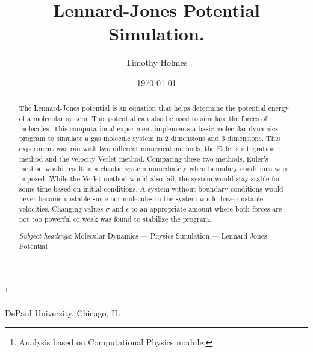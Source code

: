 \documentclass[reprint,amsmath,amssymb, aps, 10pt, a4paper, english, reqno]{revtex4-1}
\begin{document}

\title{Lennard-Jones Potential Simulation.}%
\thanks{Analysis based on Computational Physics module.}%

\author{Timothy Holmes}

DePaul University, Chicago, IL\\

\date{\today}%
\setlength\parindent{0pt}
\begin{abstract}

\setlength\parindent{0pt}
The Lennard-Jones potential is an equation that helps determine the potential energy of a molecular system. This potential can also be used to simulate the forces of molecules. This computational experiment implements a basic molecular dynamics program to simulate a gas molecule system in 2 dimensions and 3 dimensions. This experiment was ran with two different numerical methods, the Euler's integration method and  the velocity Verlet method. Comparing these two methods, Euler's method would result in a chaotic system immediately when boundary conditions were imposed. While the Verlet method would also fail, the system would stay stable for some time based on initial conditions. A system without boundary conditions would never become unstable since not molecules in the system would have unstable velocities. Changing values $\sigma$ and $\epsilon$ to an appropriate amount where both forces are not too powerful or weak was found to stabilize the program. 

\vspace{4mm}

\textit{Subject headings}: Molecular Dynamics --- Physics Simulation --- Lennard-Jones Potential

\end{abstract}

\maketitle
\end{document}
